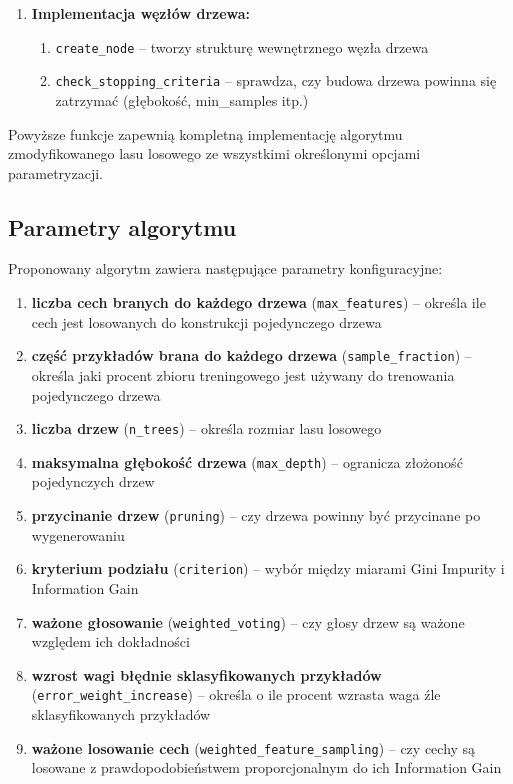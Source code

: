 \documentclass[12pt,a4paper]{article}
\begin{document}
\begin{enumerate}
    \item \textbf{Implementacja węzłów drzewa:}
    \begin{enumerate}
        \item \texttt{create\_node} -- tworzy strukturę wewnętrznego węzła drzewa
        \item \texttt{check\_stopping\_criteria} -- sprawdza, czy budowa drzewa powinna się zatrzymać (głębokość, min\_samples itp.)
    \end{enumerate}
\end{enumerate}

Powyższe funkcje zapewnią kompletną implementację algorytmu zmodyfikowanego lasu losowego ze wszystkimi określonymi opcjami parametryzacji.

\subsection{Parametry algorytmu}

Proponowany algorytm zawiera następujące parametry konfiguracyjne:

\begin{enumerate}
    \item \textbf{liczba cech branych do każdego drzewa} (\texttt{max\_features}) -- określa ile cech jest losowanych do konstrukcji pojedynczego drzewa
    \item \textbf{część przykładów brana do każdego drzewa} (\texttt{sample\_fraction}) -- określa jaki procent zbioru treningowego jest używany do trenowania pojedynczego drzewa
    \item \textbf{liczba drzew} (\texttt{n\_trees}) -- określa rozmiar lasu losowego
    \item \textbf{maksymalna głębokość drzewa} (\texttt{max\_depth}) -- ogranicza złożoność pojedynczych drzew
    \item \textbf{przycinanie drzew} (\texttt{pruning}) -- czy drzewa powinny być przycinane po wygenerowaniu
    \item \textbf{kryterium podziału} (\texttt{criterion}) -- wybór między miarami Gini Impurity i Information Gain
    \item \textbf{ważone głosowanie} (\texttt{weighted\_voting}) -- czy głosy drzew są ważone względem ich dokładności
    \item \textbf{wzrost wagi błędnie sklasyfikowanych przykładów} (\texttt{error\_weight\_increase}) -- określa o ile procent wzrasta waga źle sklasyfikowanych przykładów
    \item \textbf{ważone losowanie cech} (\texttt{weighted\_feature\_sampling}) -- czy cechy są losowane z prawdopodobieństwem proporcjonalnym do ich Information Gain
\end{enumerate}
\end{document}
